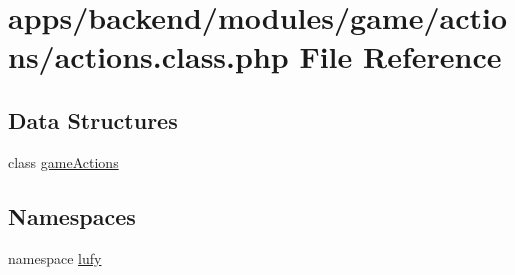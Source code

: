 \hypertarget{backend_2modules_2game_2actions_2actions_8class_8php}{\section{apps/backend/modules/game/actions/actions.class.\-php File Reference}
\label{backend_2modules_2game_2actions_2actions_8class_8php}
}
\subsection*{Data Structures}
\begin{DoxyCompactItemize}
\item 
class \hyperlink{classgame_actions}{game\-Actions}
\end{DoxyCompactItemize}
\subsection*{Namespaces}
\begin{DoxyCompactItemize}
\item 
namespace \hyperlink{namespacelufy}{lufy}
\end{DoxyCompactItemize}
